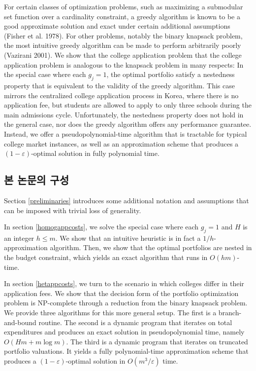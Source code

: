 \documentclass[12pt]{article} %
\newif\ifen
\theoremstyle{definition}
\theoremstyle{definition}
\begin{document}
For certain classes of optimization problems, such as maximizing a submodular set function over a cardinality constraint, a greedy algorithm is known to be a good approximate solution and exact under certain additional assumptions (Fisher et al. 1978). For other problems, notably the binary knapsack problem, the most intuitive greedy algorithm can be made to perform arbitrarily poorly (Vazirani 2001). We show that the college application problem that the college application problem is analogous to the knapsack problem in many respects: In the special case where each $g_j = 1$, the optimal portfolio satisfy a nestedness property that is equivalent to the validity of the greedy algorithm. This case mirrors the centralized college application process in Korea, where there is no application fee, but students are allowed to apply to only three schools during the main admissions cycle. Unfortunately, the nestedness property does not hold in the general case, nor does the greedy algorithm offers any performance guarantee. Instead, we offer a pseudopolynomial-time algorithm that is tractable for typical college market instances, as well as an approximation scheme that produces a $(1 - \varepsilon)$-optimal solution in fully polynomial time. 


\ifen \subsection{Structure of this paper} \else \subsection{본 논문의 구성}\fi
Section \ref{preliminaries} introduces some additional notation and assumptions that can be imposed with trivial loss of generality. 

In section \ref{homogappcosts}, we solve the special case where each $g_j = 1$ and $H$ is an integer $h \leq m$.  We show that an intuitive heuristic is in fact a $1/h$-approximation algorithm. Then, we show that the optimal portfolios are nested in the budget constraint, which yields an exact algorithm that runs in $O(hm)$-time.

In section \ref{hetappcosts}, we turn to the scenario in which colleges differ in their application fees. We show that the decision form of the portfolio optimization problem is NP-complete through a reduction from the binary knapsack problem. We provide three algorithms for this more general setup. The first is a branch-and-bound routine. The second is a dynamic program that iterates on total expenditures and produces an exact solution in pseudopolynomial time, namely $O(Hm + m \log m)$. The third is a dynamic program that iterates on truncated portfolio valuations. It yields a fully polynomial-time approximation scheme that produces a $(1 - \varepsilon)$-optimal solution in $O(m^3 / \varepsilon)$ time.  
\end{document}
